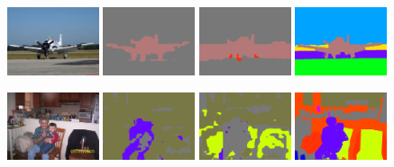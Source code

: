 \begin{figure}[tbh!]
  {\includegraphics[width=0.24\textwidth]{figures/experiments/context/image/0005.jpg}}
  {\includegraphics[width=0.24\textwidth]{figures/experiments/context/orgckpt/0005.png}}
  {\includegraphics[width=0.24\textwidth]{figures/experiments/context/nonnoisy/0005.png}}
  {\includegraphics[width=0.24\textwidth]{figures/experiments/context/gt/2008_000021.png}}

 {\includegraphics[width=0.24\textwidth]{figures/experiments/context/image/0013.jpg}}
  {\includegraphics[width=0.24\textwidth]{figures/experiments/context/orgckpt/0013.png}}
  {\includegraphics[width=0.24\textwidth]{figures/experiments/context/nonnoisy/0013.png}}
  {\includegraphics[width=0.24\textwidth]{figures/experiments/context/gt/2008_000051.png}}


\end{figure}
